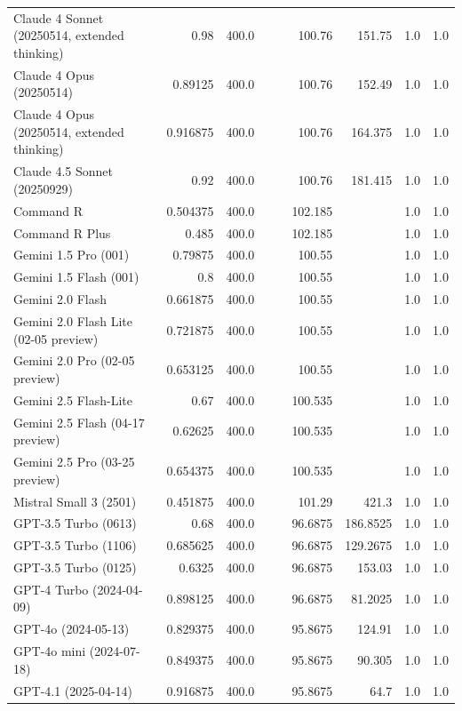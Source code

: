 \begin{table}[htp]
{\begin{tabular}{lrrrrrrrr}
Claude 4 Sonnet (20250514, extended thinking) & 0.98 & 400.0 &  &  & 100.76 & 151.75 & 1.0 & 1.0 \\
Claude 4 Opus (20250514) & 0.89125 & 400.0 &  &  & 100.76 & 152.49 & 1.0 & 1.0 \\
Claude 4 Opus (20250514, extended thinking) & 0.916875 & 400.0 &  &  & 100.76 & 164.375 & 1.0 & 1.0 \\
Claude 4.5 Sonnet (20250929) & 0.92 & 400.0 &  &  & 100.76 & 181.415 & 1.0 & 1.0 \\
Command R & 0.504375 & 400.0 &  &  & 102.185 &  & 1.0 & 1.0 \\
Command R Plus & 0.485 & 400.0 &  &  & 102.185 &  & 1.0 & 1.0 \\
Gemini 1.5 Pro (001) & 0.79875 & 400.0 &  &  & 100.55 &  & 1.0 & 1.0 \\
Gemini 1.5 Flash (001) & 0.8 & 400.0 &  &  & 100.55 &  & 1.0 & 1.0 \\
Gemini 2.0 Flash & 0.661875 & 400.0 &  &  & 100.55 &  & 1.0 & 1.0 \\
Gemini 2.0 Flash Lite (02-05 preview) & 0.721875 & 400.0 &  &  & 100.55 &  & 1.0 & 1.0 \\
Gemini 2.0 Pro (02-05 preview) & 0.653125 & 400.0 &  &  & 100.55 &  & 1.0 & 1.0 \\
Gemini 2.5 Flash-Lite & 0.67 & 400.0 &  &  & 100.535 &  & 1.0 & 1.0 \\
Gemini 2.5 Flash (04-17 preview) & 0.62625 & 400.0 &  &  & 100.535 &  & 1.0 & 1.0 \\
Gemini 2.5 Pro (03-25 preview) & 0.654375 & 400.0 &  &  & 100.535 &  & 1.0 & 1.0 \\
Mistral Small 3 (2501) & 0.451875 & 400.0 &  &  & 101.29 & 421.3 & 1.0 & 1.0 \\
GPT-3.5 Turbo (0613) & 0.68 & 400.0 &  &  & 96.6875 & 186.8525 & 1.0 & 1.0 \\
GPT-3.5 Turbo (1106) & 0.685625 & 400.0 &  &  & 96.6875 & 129.2675 & 1.0 & 1.0 \\
GPT-3.5 Turbo (0125) & 0.6325 & 400.0 &  &  & 96.6875 & 153.03 & 1.0 & 1.0 \\
GPT-4 Turbo (2024-04-09) & 0.898125 & 400.0 &  &  & 96.6875 & 81.2025 & 1.0 & 1.0 \\
GPT-4o (2024-05-13) & 0.829375 & 400.0 &  &  & 95.8675 & 124.91 & 1.0 & 1.0 \\
GPT-4o mini (2024-07-18) & 0.849375 & 400.0 &  &  & 95.8675 & 90.305 & 1.0 & 1.0 \\
GPT-4.1 (2025-04-14) & 0.916875 & 400.0 &  &  & 95.8675 & 64.7 & 1.0 & 1.0 \\

\end{tabular}}
\end{table}
